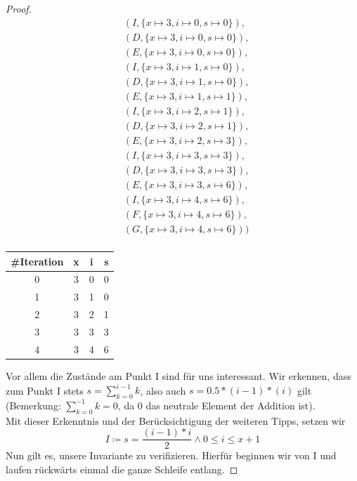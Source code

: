 \documentclass[hidelinks]{article}
\theoremstyle{plain}
\theoremstyle{definition}
\theoremstyle{rem}
\begin{document}
\begin{sloppypar}
\begin{proof}
{\begin{minipage}[ht]{0.48\linewidth}
\begin{align*}
&(I,\{x\mapsto 3,i\mapsto 0, s\mapsto 0\}),\\
&(D,\{x\mapsto 3,i\mapsto 0, s\mapsto 0\}),\\
&(E,\{x\mapsto 3,i\mapsto 0, s\mapsto 0\}),\\
&(I,\{x\mapsto 3,i\mapsto 1, s\mapsto 0\}),\\
&(D,\{x\mapsto 3,i\mapsto 1, s\mapsto 0\}),\\
&(E,\{x\mapsto 3,i\mapsto 1, s\mapsto 1\}),\\
&(I,\{x\mapsto 3,i\mapsto 2, s\mapsto 1\}),\\
&(D,\{x\mapsto 3,i\mapsto 2, s\mapsto 1\}),\\
&(E,\{x\mapsto 3,i\mapsto 2, s\mapsto 3\}),\\
&(I,\{x\mapsto 3,i\mapsto 3, s\mapsto 3\}),\\
&(D,\{x\mapsto 3,i\mapsto 3, s\mapsto 3\}),\\
&(E,\{x\mapsto 3,i\mapsto 3, s\mapsto 6\}),\\
&(I,\{x\mapsto 3,i\mapsto 4, s\mapsto 6\}),\\
&(F,\{x\mapsto 3,i\mapsto 4, s\mapsto 6\}),\\
&(G,\{x\mapsto 3,i\mapsto 4, s\mapsto 6\}))\\
\end{align*}
\end{minipage}}
\hfill
\begin{minipage}[ht]{0.48\linewidth}
\centering
\begin{tabular}{|c|c|c|c|}
  \hline
  \#Iteration & x & i & s\\\hline
  0 & 3 & 0 & 0\\\hline
  1 & 3 & 1 & 0\\\hline
  2 & 3 & 2 & 1\\\hline
  3 & 3 & 3 & 3\\\hline
  4 & 3 & 4 & 6\\\hline
\end{tabular}
\end{minipage}
Vor allem die Zustände am Punkt I sind für uns interessant. Wir erkennen, dass zum Punkt I stets $s=\sum_{k=0}^{i-1}k$, also auch $s=0.5*(i-1)*(i)$ gilt (Bemerkung: $\sum_{k=0}^{-1}k=0$, da 0 das neutrale Element der Addition ist).\\
Mit dieser Erkenntnis und der Berücksichtigung der weiteren Tipps, setzen wir
\begin{equation*}
I\coloneqq s=\frac{(i-1)*i}{2}\wedge 0\le i\le x+1
\end{equation*}
Nun gilt es, unsere Invariante zu verifizieren. Hierfür beginnen wir von I und laufen rückwärts einmal die ganze Schleife entlang.

\end{proof}
\end{sloppypar}
\end{document}
